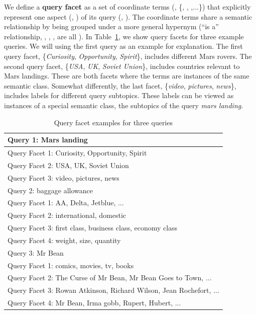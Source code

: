 We define a \textbf{query facet} as a set of coordinate terms (\eg, \{, , ,...\}) that explicitly represent one aspect (\eg, ) of its query (\eg, ). The coordinate terms share a semantic relationship by being grouped under a more general hypernym (``is a'' relationship, \eg, , ,  are all ). 
In Table~\ref{tab:facet-facetexample}, we show query facets for three example queries. We will using the first query  as an example for explanation. The first query facet, \{\textit{Curiosity}, \textit{Opportunity}, \textit{Spirit}\}, includes different Mars rovers. The second query facet, \{\textit{USA}, \textit{UK}, \textit{Soviet Union}\}, includes countries relevant to Mars landings. These are both facets where the terms are instances of the same semantic class. 
Somewhat differently, the last facet, \{\textit{video}, \textit{pictures}, \textit{news}\}, includes labels for different query subtopics. These labels can be viewed as instances of a special semantic class, the subtopics of the query \textit{mars landing}.
\begin{table}[H]
\centering
\caption{Query facet examples for three queries}
\label{tab:facet-facetexample}
\begin{tabular}{|l|} \hline
Query 1: Mars landing \\\hline
Query Facet 1: Curiosity, Opportunity, Spirit \\
Query Facet 2: USA, UK, Soviet Union \\
Query Facet 3: video, pictures, news \\\hhline{|=|}
Query 2: baggage allowance \\\hline
Query Facet 1: AA, Delta, Jetblue,  ... \\
Query Facet 2: international, domestic \\
Query Facet 3: first class, business class, economy class \\
Query Facet 4: weight, size, quantity \\\hhline{|=|}
Query 3: Mr Bean \\\hline
Query Facet 1: comics, movies, tv, books \\
Query Facet 2: The Curse of Mr Bean, Mr Bean Goes to Town, ...\\
Query Facet 3: Rowan Atkinson, Richard Wilson, Jean Rochefort,  ...\\ 
Query Facet 4: Mr Bean, Irma gobb, Rupert, Hubert, ...\\\hline
\end{tabular}
\end{table}


